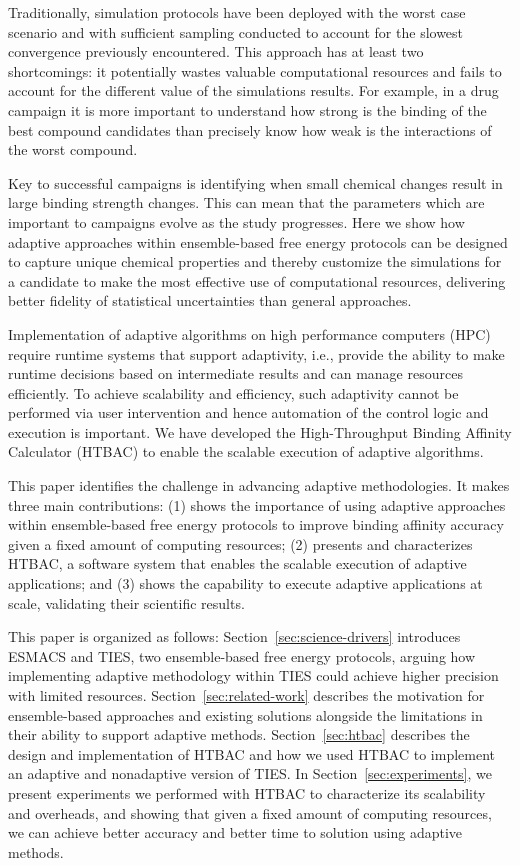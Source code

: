 Traditionally, simulation protocols have been deployed with the worst case
scenario and with sufficient sampling conducted to account for the slowest
convergence previously encountered. This approach has at least two
shortcomings: it potentially wastes valuable computational resources  and
fails to account for the different value of the simulations results. For
example, in a drug campaign it is more important to understand how strong is
the binding of the best compound candidates than precisely know how weak is
the interactions of the worst compound.

Key to successful campaigns is identifying when small chemical changes result
in large binding strength changes. This can mean that the parameters which
are important to campaigns evolve as the study progresses. Here we show how
adaptive approaches within ensemble-based free energy protocols can be
designed to capture unique chemical properties and thereby customize the
simulations for a candidate to make the most effective use of computational
resources, delivering better fidelity of statistical uncertainties than
general approaches.

Implementation of adaptive algorithms on high performance computers (HPC)
require runtime systems that support adaptivity, i.e., provide the ability to
make runtime decisions based on intermediate results and can manage resources
efficiently. To achieve scalability and efficiency, such adaptivity cannot be
performed via user intervention and hence automation of the control logic and
execution is important. We have developed the High-Throughput Binding
Affinity Calculator (HTBAC) to enable the scalable execution of adaptive
algorithms.

This paper identifies the challenge in advancing adaptive methodologies. It
makes three main contributions: (1) shows the importance of using adaptive
approaches within ensemble-based free energy protocols to improve binding
affinity accuracy given a fixed amount of computing resources; (2) presents
and characterizes HTBAC, a software system that enables the scalable
execution of adaptive applications; and (3) shows the capability to execute
adaptive applications at scale, validating their scientific results.

This paper is organized as follows: Section~\ref{sec:science-drivers}
introduces ESMACS and TIES, two ensemble-based free energy protocols, arguing
how implementing adaptive methodology within TIES could achieve higher
precision with limited resources. Section~\ref{sec:related-work} describes
the motivation for ensemble-based approaches and existing solutions alongside
the limitations in their ability to support adaptive methods.
Section~\ref{sec:htbac} describes the design and implementation of HTBAC and
how we used HTBAC to implement an adaptive and nonadaptive version of TIES.
In Section~\ref{sec:experiments}, we present experiments we performed with
HTBAC to characterize its scalability and overheads, and showing that given a
fixed amount of computing resources, we can achieve better accuracy and
better time to solution using adaptive methods.